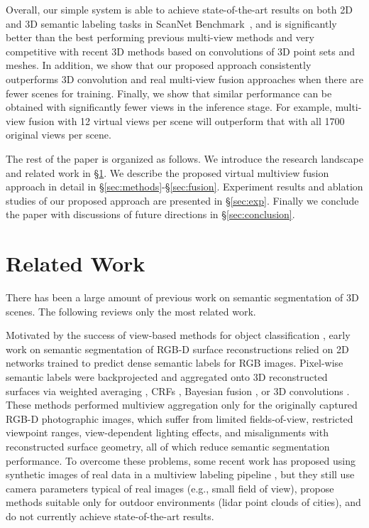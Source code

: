 \documentclass[runningheads]{llncs}
\newcommand{\Sec}[1]{\S\ref{#1}}
\begin{document}
Overall, our simple system is able to achieve state-of-the-art results on both 2D and 3D semantic labeling tasks in ScanNet Benchmark~\cite{dai2017scannet}, and is significantly better than the best performing previous multi-view methods and very competitive with recent 3D methods based on convolutions of 3D point sets and meshes. In addition, we show that our proposed approach consistently outperforms 3D convolution and real multi-view fusion approaches when there are fewer scenes for training. Finally, we show that similar performance can be obtained with significantly fewer views in the inference stage. For example, multi-view fusion with 12 virtual views per scene will outperform that with all 1700 original views per scene.

The rest of the paper is organized as follows. We introduce the research landscape and related work in \Sec{sec:related_work}. We describe the proposed virtual multiview fusion approach in detail in \Sec{sec:methods}-\Sec{sec:fusion}. Experiment results and ablation studies of our proposed approach are presented in \Sec{sec:exp}. Finally we conclude the paper with discussions of future directions in \Sec{sec:conclusion}.

%
 \section{Related Work}\label{sec:related_work}

There has been a large amount of previous work on semantic segmentation of 3D scenes.  The following reviews only the most related work.

\vspace*{2mm}  Motivated by the success of view-based methods for object classification \cite{su2015multi}, early work on semantic segmentation of RGB-D surface reconstructions relied on 2D networks trained to predict dense semantic labels for RGB images.  Pixel-wise semantic labels were backprojected and aggregated onto 3D reconstructed surfaces via weighted averaging \cite{hermans2014dense,vineet2015incremental}, CRFs \cite{mccormac2017semanticfusion}, Bayesian fusion \cite{ma2017multi,vineet2015incremental,zhang2019large}, or 3D convolutions \cite{dai20183dmv,jaritz2019multi,lai2014unsupervised}.  These methods performed multiview aggregation only for the originally captured RGB-D photographic images, which suffer from limited fields-of-view, restricted viewpoint ranges, view-dependent lighting effects, and misalignments with reconstructed surface geometry, all of which reduce semantic segmentation performance.   To overcome these problems, some recent work has proposed using synthetic images of real data in a multiview labeling pipeline \cite{boulch2018snapnet,lawin2017deep,guerry2017snapnet}, but they still use camera parameters typical of real images (e.g., small field of view), propose methods suitable only for outdoor environments (lidar point clouds of cities), and do not currently achieve state-of-the-art results.
\end{document}
